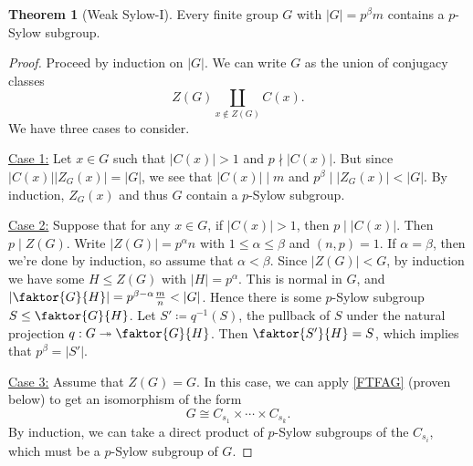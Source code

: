 \documentclass[10pt,letterpaper,cm]{nupset}
\theoremstyle{definition}
\theoremstyle{theorem}
\newtheorem{theorem}[definition]{Theorem}
\theoremstyle{remark}
\newcommand{\1}{\mathbf{1}}
\newcommand{\0}{\vec 0}
\begin{document}
\begin{theorem}[Weak Sylow-I]\label{ws1}
Every finite group $G$ with $\left\lvert{G}\right\rvert = p^{\beta}m$ contains a $p$-Sylow subgroup.
\end{theorem}
\begin{proof}
Proceed by induction on $\left\lvert{G}\right\rvert$. We can write $G$ as the union of conjugacy classes $$Z(G) \coprod_{x\notin Z(G)} C(x).$$ We have three cases to consider.

\smallskip

 \underline{Case 1:} Let $x\in G$ such that $\left\lvert{C(x)}\right\rvert>1$ and $p\nmid \left\lvert{C(x)}\right\rvert$. But since $\left\lvert{C(x)}\right\rvert\left\lvert{Z_G(x)}\right\rvert =\left\lvert{G}\right\rvert$, we see that $\left\lvert{C(x)}\right\rvert \mid m$ and $p^{\beta}\mid \left\lvert{Z_G(x)}\right\rvert< \left\lvert{G}\right\rvert$. By induction, $Z_G(x)$ and thus $G$ contain a $p$-Sylow subgroup.

\medskip

 \underline{Case 2:}
 Suppose that for any $x\in G$, if $\left\lvert{C(x)}\right\rvert >1$, then $p\mid \left\lvert{C(x)}\right\rvert$. Then $p\mid Z(G)$. Write $\left\lvert{Z(G)}\right\rvert = p^{\alpha}n$ with $1\leq \alpha\leq \beta$ and $\left(n, p\right)=1$. If $\alpha = \beta$, then we're done by induction, so assume that $\alpha <
 \beta$. Since $\left\lvert{Z(G)}\right\rvert < G$, by induction we have some $H\leq Z(G)$ with $\left\lvert{H}\right\rvert = p^{\alpha}$. This is normal in $G$, and $\left\lvert{\faktor{G}{H}}\right\rvert = p^{\beta - \alpha}\frac{m}{n} < \left\lvert{G}\right\rvert$. Hence there is some $p$-Sylow subgroup $S\leq \faktor{G}{H}$.  Let $S'\coloneqq q^{-1}(S)$, the pullback of $S$ under the natural projection $q: G\twoheadrightarrow \faktor{G}{H}$.  Then $\faktor{S'}{H} =S$, which implies that $p^{\beta}= \left\lvert{S'}\right\rvert$. 

\medskip

 \underline{Case 3:} Assume that $Z(G) = G$. In this case, we can apply \cref{FTFAG} (proven below) to get an isomorphism of the form 
 \[
 G \cong C_{s_1}\times \cdots \times C_{s_k}.
 \] By induction, we can take a direct product of $p$-Sylow subgroups of the $C_{s_i}$, which must be a $p$-Sylow subgroup of $G$.
\end{proof}

\smallskip
\end{document}
